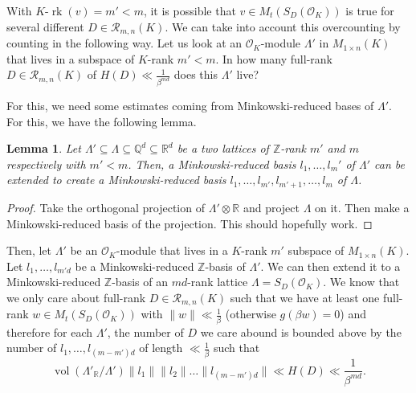 \documentclass{amsart}
\newtheorem{lemma}[theorem]{Lemma}
\newcommand{\OK}{\mathcal{O}_K}
\DeclareMathOperator{\vol}{vol}
\DeclareMathOperator{\rank}{rk}
\begin{document}
 With $K$-$\rank(v) = m'<m$, it is possible that $v \in M_{t }(S_D(\OK))$ is true for several different $D \in \mathcal{R}_{m,n}(K)$. We can take into account this overcounting by counting in the following way.
Let us look at an $\OK$-module $\Lambda'$ in $M_{1 \times n}(K)$ that lives in a subspace of $K$-rank $m'<m$. 
In how many full-rank $D \in \mathcal{R}_{m,n}(K)$ 
of $H(D) \ll \frac{1}{\beta^{md}}$ does this 
$\Lambda'$ live?

For this, we need some estimates coming from Minkowski-reduced bases of $\Lambda'$. For this, we have the following lemma.
\begin{lemma}
  Let $\Lambda' \subseteq \Lambda \subseteq \mathbb{Q}^{d} \subseteq \mathbb{R}^{d}$ be a two lattices of $\mathbb{Z}
  $-rank $m'$ and $m$ respectively with $m'<m$. Then, a Minkowski-reduced basis $l_1,\dots,l_m'$ of $\Lambda'$ can be extended to create a Minkowski-reduced basis $l_1,\dots,l_{m'}, l_{m'+1},\dots,l_m$ of $\Lambda$.
\end{lemma}
\begin{proof}
Take the orthogonal projection of $\Lambda' \otimes \mathbb{R}$ and project $\Lambda$ on it. Then make a Minkowski-reduced basis of the projection. This should hopefully work.
\end{proof}

Then, let $\Lambda'$ be an $\OK$-module that lives in a $K$-rank $m'$ subspace of $M_{1\times n}(K)$. 
Let $l_1,\dots,l_{m'd}$ be a Minkowski-reduced $\mathbb{Z}$-basis of $\Lambda'$. 
We can then extend it to a Minkowski-reduced $\mathbb{Z}$-basis of an $md$-rank lattice $\Lambda = S_D(\OK)$. 
We know that we only care about full-rank $D \in \mathcal{R}_{m,n}(K)$ 
such that we have at least one full-rank $w \in M_t(S_D(\OK))$ with 
$\|w\| \ll \frac{1}{\beta}$ (otherwise $g(\beta w) = 0$)
and therefore for each $\Lambda'$, the number of $D$ we care abound is bounded above by the number of $l_1,\dots,l_{(m-m')d}$
of length $\ll \frac{1}{\beta}$ such that 
\begin{equation}
\vol(\Lambda'_\mathbb{R}/ \Lambda') \|l_1\| \|l_2\|\dots \|l_{(m-m')d}\| \ll H(D) \ll \frac{1}{\beta^{md}}.
\end{equation}
\end{document}
